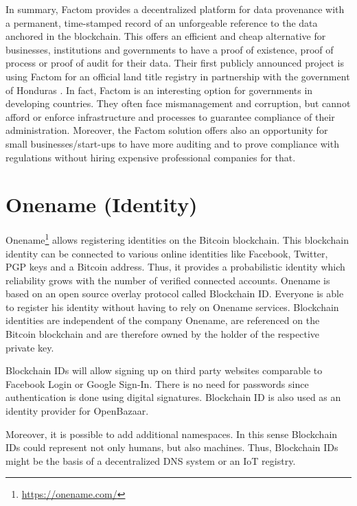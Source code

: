 In summary, Factom provides a decentralized platform for data provenance with a 
permanent, time-stamped record of an unforgeable reference to the data anchored 
in the blockchain. This offers an efficient and cheap alternative for businesses, 
institutions and governments to have a proof of existence, proof of process or 
proof of audit for their data. Their first publicly announced project is using 
Factom for an official land title registry in partnership with the government of 
Honduras \parencite{Chavez2015}. In fact, Factom is an interesting option for 
governments in developing countries. They often face mismanagement and corruption, 
but cannot afford or enforce infrastructure and processes to guarantee compliance 
of their administration. Moreover, the Factom solution offers also an opportunity 
for small businesses/start-ups to have more auditing and to prove compliance with 
regulations without hiring expensive professional companies for that.

\section{Onename (Identity)}
\label{sec:ecoonename}

Onename\footnote{\url{https://onename.com/}} allows registering identities on the Bitcoin blockchain. This blockchain 
identity can be connected to various online identities like Facebook, Twitter, 
PGP keys and a Bitcoin address. Thus, it provides a probabilistic identity which 
reliability grows with the number of verified connected accounts. Onename is based 
on an open source overlay protocol called Blockchain ID. Everyone is able to register 
his identity without having to rely on Onename services. Blockchain identities 
are independent of the company Onename, are referenced on the Bitcoin blockchain 
and are therefore owned by the holder of the respective private key.

Blockchain IDs will allow signing up on third party websites comparable to Facebook 
Login or Google Sign-In. There is no need for passwords since authentication is 
done using digital signatures. Blockchain ID is also used as an identity provider 
for OpenBazaar. 

Moreover, it is possible to add additional namespaces. In this sense Blockchain 
IDs could represent not only humans, but also machines. Thus, Blockchain IDs might 
be the basis of a decentralized \ac{DNS} system or an IoT registry. 

